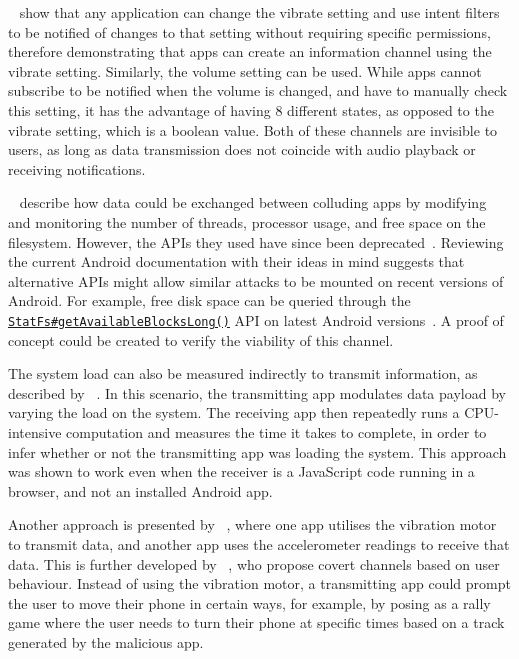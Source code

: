\documentclass[article, oneside]{aaltoseries}
\newcommand{\TODO}[1]{\todo[inline]{#1}}
\begin{document}
\citeauthor{Schlegel2011}~\cite{Schlegel2011} show that any application can change the vibrate setting and use intent filters to be notified of changes to that setting without requiring specific permissions, therefore demonstrating that apps can create an information channel using the vibrate setting. Similarly, the volume setting can be used. While apps cannot subscribe to be notified when the volume is changed, and have to manually check this setting, it has the advantage of having 8 different states, as opposed to the vibrate setting, which is a boolean value. Both of these channels are invisible to users, as long as data transmission does not coincide with audio playback or receiving notifications.

\citeauthor{Marforio2012}~\cite{Marforio2012} describe how data could be exchanged between colluding apps by modifying and monitoring the number of threads, processor usage, and free space on the filesystem. However, the APIs they used have since been deprecated~\cite{nn2017}. Reviewing the current Android documentation with their ideas in mind suggests that alternative APIs might allow similar attacks to be mounted on recent versions of Android. For example, free disk space can be queried through the \href{https://developer.android.com/reference/android/os/StatFs.html#getAvailableBlocksLong()}{\texttt{StatFs\#getAvailableBlocksLong()}} API on latest Android versions~\cite{AOSPdeveloper}. A proof of concept could be created to verify the viability of this channel.

The system load can also be measured indirectly to transmit information, as described by \citeauthor{Marforio2012}~\cite{Marforio2012}. In this scenario, the transmitting app modulates data payload by varying the load on the system. The receiving app then repeatedly runs a CPU-intensive computation and measures the time it takes to complete, in order to infer whether or not the transmitting app was loading the system. This approach was shown to work even when the receiver is a JavaScript code running in a browser, and not an installed Android app.

Another approach is presented by \citeauthor{Al-Haiqi2014}~\cite{Al-Haiqi2014}, where one app utilises the vibration motor to transmit data, and another app uses the accelerometer readings to receive that data. This is further developed by \citeauthor{Qi2018}~\cite{Qi2018}, who propose covert channels based on user behaviour. Instead of using the vibration motor, a transmitting app could prompt the user to move their phone in certain ways, for example, by posing as a rally game where the user needs to turn their phone at specific times based on a track generated by the malicious app.
\\
\TODO{Add a subsection conclusion paragraph}
\end{document}
